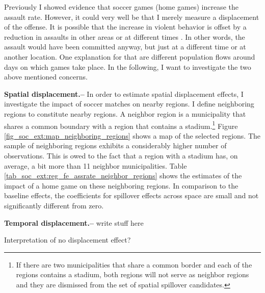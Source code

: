 \documentclass[11pt, a4paper, draft]{article} %
\begin{document}
Previously I showed evidence that soccer games (home games) increase the assault rate. However, it could very well be that I merely measure a displacement of the offense. It is possible that the increase in violent behavior is offset by a reduction in assaults in other areas or at different times \citep{lindo2018college}. In other words, the assault would have been committed anyway, but just at a different time or at another location. One explanation for that are different population flows around days on which games take place. In the following, I want to investigate the two above mentioned concerns.


\textbf{Spatial displacement.--} In order to estimate spatial displacement effects, I investigate the impact of  soccer matches on nearby regions. I define neighboring regions to constitute nearby regions. A neighbor region is a municipality that shares a common boundary with a region that contains a stadium.\footnote{If there are two municipalities that share a common border and each of the regions contains a stadium, both regions will not serve as neighbor regions and they are dismissed from the set of spatial spillover candidates.} Figure \ref{fig_soc_ext:map_neighboring_regions} shows a map of the selected regions. The sample of neighboring regions exhibits a considerably higher number of observations. This is owed to the fact that a region with a stadium has, on average, a bit more than 11 neighbor municipalities. Table \ref{tab_soc_ext:reg_fe_assrate_neighbor_regions} shows the estimates of the impact of a home game on these neighboring regions. In comparison to the baseline effects, the coefficients for spillover effects across space are small and not significantly different from zero. 


\textbf{Temporal displacement.--} write stuff here


Interpretation of no displacement effect? 
\end{document}
